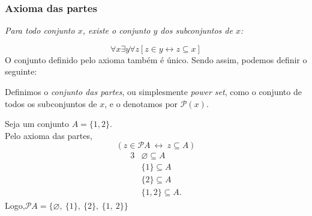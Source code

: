 \subsubsection{Axioma das partes} 
\begin{stat}
    \textit{Para todo conjunto $x$, existe o conjunto $y$ dos subconjuntos de $x$:}
\end{stat}
    $$\forall x \exists y \forall z [z \in y \leftrightarrow z \subseteq x]$$
O conjunto definido pelo axioma também é único. Sendo assim, podemos definir o seguinte:
\begin{definition}
    Definimos o \textit{conjunto das partes}, ou simplesmente \textit{power set}, como o conjunto de todos os subconjuntos de $x$, e o denotamos por $\mathcal{P}(x)$.
\end{definition}
\begin{exmp}
    Seja um conjunto $A = \{1,2\}.$\\
    Pelo axioma das partes, $$(z \in  \mathcal{P}A\ \leftrightarrow\ z \subseteq A)$$
\begin{alignat*}{3}
    & \varnothing \subseteq A\\
    & \{1\} \subseteq A\\
    & \{2\} \subseteq A\\
    & \{1,2\} \subseteq A.
\end{alignat*}
Logo,\quad $\mathcal{P}A = \{\varnothing,\ \{1\},\ \{2\},\ \{1,\ 2\}\}$
\end{exmp}

